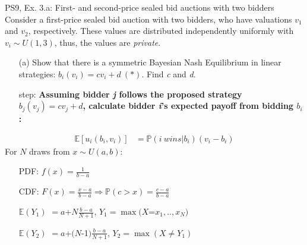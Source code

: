 \begin{frame}{PS9, Ex. 3.a: First- and second-price sealed bid auctions with two bidders}
    Consider a first-price sealed bid auction with two bidders, who have valuations $v_1$ and $v_2$, respectively. These values are distributed independently uniformly with $v_i\sim U(1,3)$, thus, the values are \textit{private}.
    \vspace{-4pt}
    \begin{itemize}
      \item[(a)] Show that there is a symmetric Bayesian Nash Equilibrium in linear strategies: $b_i(v_i) = cv_i + d\ (*)$. Find \textit{c} and \textit{d}.
    \end{itemize}
    \vspace{-8pt}
    \begin{multicols}{2}
      \begin{itemize}
        \item[\nth{1} step:] \textbf{Assuming bidder \textit{j} follows the proposed strategy $b_j(v_j) = cv_j + d$, calculate bidder \textit{i}'s expected payoff from bidding $b_i$:}
      \end{itemize}
      \vspace{-4pt}
      \begin{align*}
        \mathbb{E}[u_i(b_i,v_i)]&=\mathbb{P}(i\ wins|b_i)(v_i-b_i)
      \end{align*}
      \vfill\null\columnbreak
      For $N$ draws from $x\sim U(a, b):$
      \vspace{-6pt}
      \begin{enumerate}
        \item[PDF:] $f(x)=\frac{1}{b-a}$
        \item[CDF:] $F(x)=\frac{x-a}{b-a}\Rightarrow\mathbb{P}(c>x)=\frac{c-a}{b-a}$
        \item[$\mathbb{E}(Y_1)$] $=a$+$N\frac{b-a}{N+1}$, $Y_1=\max(X$=$x_1,..,x_N)$
        \item[$\mathbb{E}(Y_2)$] $=a$+$(N$-1$)\frac{b-a}{N+1}$, $Y_2=\max(X\neq Y_1)$
      \end{enumerate}
      \vfill\null
    \end{multicols}
\end{frame}
